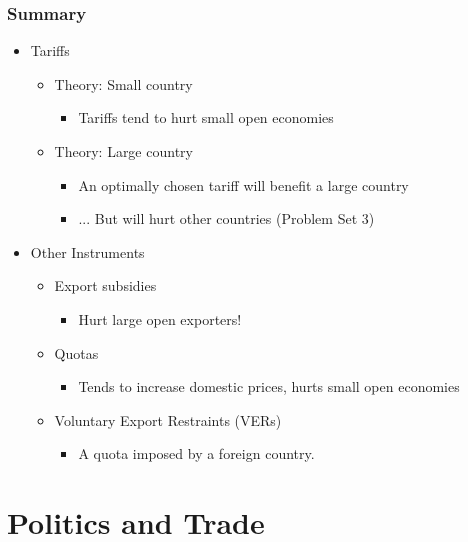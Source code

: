 \documentclass{beamer}
\begin{document}
\begin{frame}
	\frametitle{Summary}
	\begin{itemize}
		\item Tariffs
		\begin{itemize}
			\item Theory: Small country
			\begin{itemize}
				\item Tariffs tend to hurt small open economies
			\end{itemize}
			\item Theory: Large country
			\begin{itemize}
				\item An optimally chosen tariff will benefit a large country
				\item ... But will hurt other countries (Problem Set 3)
			\end{itemize}
		\end{itemize}
		\item Other Instruments
		\begin{itemize}
			\item Export subsidies
			\begin{itemize}
				\item Hurt large open exporters!
			\end{itemize}
			\item Quotas
			\begin{itemize}
				\item Tends to increase domestic prices, hurts small open economies
			\end{itemize}
			\item Voluntary Export Restraints (VERs)
			\begin{itemize}
				\item A quota imposed by a foreign country.
			\end{itemize}
		\end{itemize}
	\end{itemize}
	
\end{frame}


	
\section{Politics and Trade}
\end{document}
